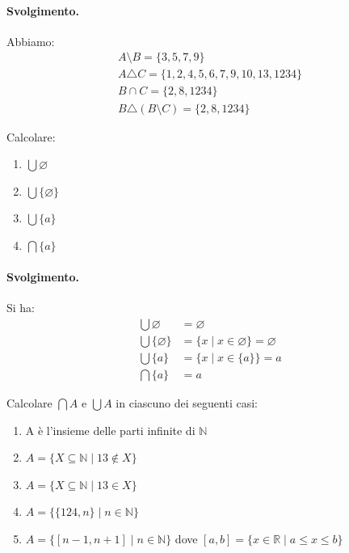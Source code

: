 \paragraph{Svolgimento.} Abbiamo:
\begin{displaymath}
	\begin{array}{l}
		A \setminus B = \{3,5,7,9\}\\
		A \triangle C = \{1,2,4,5,6,7,9,10,13,1234\}\\
		B \cap C = \{2,8,1234\}\\
		B \triangle (B \setminus C) = \{2,8,1234\}
	\end{array}
\end{displaymath}
\hfill \blacksquare
\begin{exsbox}
	Calcolare:
	\begin{enumerate}
		\item $ \bigcup \varnothing$
		\item $ \bigcup \{ \varnothing \} $
		\item $ \bigcup \{ a \}$
		\item $ \bigcap \{ a \} $
	\end{enumerate}
\end{exsbox}
\paragraph{Svolgimento.} Si ha:
\begin{align*}
	\bigcup  \varnothing &= \varnothing \\
	\bigcup  \{ \varnothing \} &= \{ x \; | \; x \in \varnothing \} = \varnothing  \\
	\bigcup  \{a \} &= \{ x \; | \; x \in \{ a \} \} = a \\
	\bigcap  \{a \} &= a
\end{align*}
\hfill \blacksquare
\begin{exsbox}
	Calcolare $\bigcap A$ e $\bigcup A$ in ciascuno dei seguenti casi:
	\begin{enumerate}
		\item A è l'insieme delle parti infinite di $\mathbb{N}$
		\item $A=\{X \subseteq \mathbb{N} \;|\; 13 \notin X \}$
		\item $A=\{X \subseteq \mathbb{N} \;|\; 13 \in X \}$
		\item $A=\{\{124,n\} \; | \; n \in \mathbb{N}\}$
		\item $A=\{[n-1,n+1] \; | \; n \in \mathbb{N}\}$ dove $[a,b]=\{x \in \mathbb{R} \; | \; a \leq x \leq b \}$
	\end{enumerate}
\end{exsbox}

